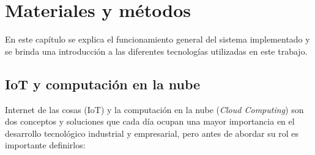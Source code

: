 \chapter{Materiales y métodos} %

\label{Chapter2}


En este capítulo se explica el funcionamiento general del sistema implementado y se brinda una introducción a las diferentes tecnologías utilizadas en este trabajo.


\section{IoT y computación en la nube}

Internet de las cosas (IoT) y la computación en la nube (\emph{Cloud Computing}) son dos conceptos y soluciones que cada día ocupan una mayor importancia en el desarrollo tecnológico industrial y empresarial, pero antes de abordar su rol es importante definirlos:

